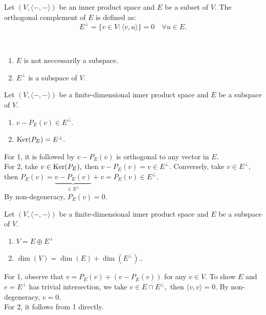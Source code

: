 \begin{definition}
    Let $(V,\langle-,-\rangle)$ be an inner product space and $E$ be a subset of $V$.
    The orthogonal complement of $E$ is defined as:
    \[E^\perp=\{v\in V: \langle v,u\rangle\}=0\quad\forall u\in E.\]
\end{definition}

\begin{remark}\
    \begin{enumerate}
        \item $E$ is not neccessarily a subspace.
        \item $E^\perp$ is a subspace of $V$.
    \end{enumerate}
\end{remark}

\begin{theorem}
 Let $(V,\langle-,-\rangle)$ be a finite-dimensional inner product space and $E$ be a subspace of $V$.
 \begin{enumerate}
    \item $v-P_E(v)\in E^\perp.$
    \item $\operatorname{Ker}(P_E)=E^\perp.$
\end{enumerate}
\end{theorem}

\begin{pfbox}
    For 1, it is followed by $v-P_E(v)$ is orthogonal to any vector in $E$.\\
    For 2, take $v\in \operatorname{Ker}(P_E),$ then $v-P_E(v)=v\in E^\perp.$
    Conversely, take $v\in E^\perp,$ then $P_E(v)=\underbrace{v-P_E(v)}_{\in E^\perp}+v=P_E(v)\in E^\perp.$\\
    By non-degeneracy, $P_E(v)=0.$
\end{pfbox}


\begin{theorem}
 Let $(V,\langle-,-\rangle)$ be a finite-dimensional inner product space and $E$ be a subspace of $V$.
 \begin{enumerate}
    \item $V=E\oplus E^\perp$
    \item $\dim(V)=\dim(E)+\dim(E^\perp)..$
\end{enumerate}
\end{theorem}

\begin{pfbox}
    For 1, observe that $v=P_E(v)+(v-P_E(v))$ for any $v\in V.$ To show $E$ and $e=E^\perp$ has trivial intersection, we take $v\in E\cap E^\perp,$ then $\langle v,v\rangle=0.$ By non-degeneracy, $v=0.$\\
    For 2, it follows from 1 directly.
\end{pfbox}



